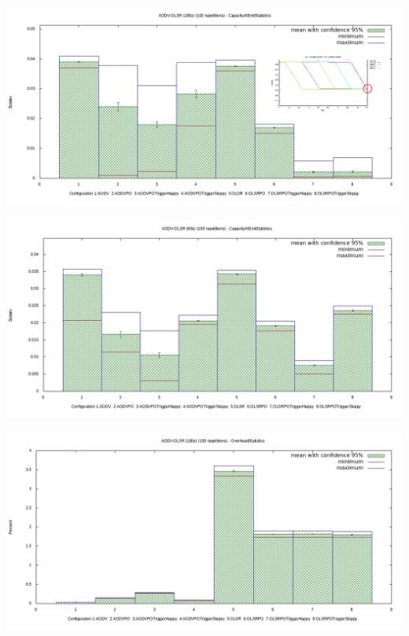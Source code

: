 \documentclass[11pt,handout,notes=only]{beamer}
\begin{document}
\begin{frame}{\insertsubsection}
\includegraphics[scale=0.35]{compare-capdev}
\end{frame}

\begin{frame}{\insertsubsection}
\includegraphics[scale=0.35]{compare-capdev-short}
\end{frame}

\begin{frame}{\insertsubsection}
\includegraphics[scale=0.35]{compoverhead}
\end{frame}

\end{document}
